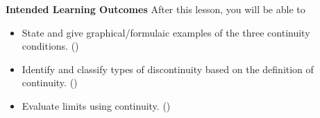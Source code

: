\documentclass[10pt]{article}
\begin{document}
\thispagestyle{firstpage}
\pagestyle{otherpages}

\textbf{Intended Learning Outcomes}
After this lesson, you will be able to 

\begin{itemize}
    \item State and give graphical/formulaic examples of the three continuity conditions. ()
    \item Identify and classify types of discontinuity based on the definition of continuity. ()
    \item Evaluate limits using continuity. ()
\end{itemize}

\vspace{-0.5cm}

\hrulefill
\end{document}
